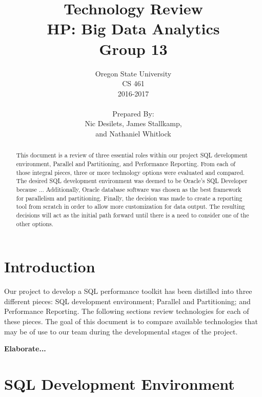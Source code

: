 \documentclass[draftclsnofoot, onecolumn, compsoc, 10pt]{IEEEtran}
\title{\Huge Technology Review\\\large HP: Big Data Analytics\\Group 13}
\author{Oregon State University\\CS 461\\2016-2017\\\\Prepared By:\\Nic Desilets, James Stallkamp,\\and Nathaniel Whitlock}
\begin{document}
\begin{titlingpage}
    \maketitle 
    
    \vspace{1in}
    \begin{abstract}
		\noindent This document is a review of three essential roles within our project SQL development environment, Parallel and Partitioning, and Performance Reporting.
        From each of those integral pieces, three or more technology options were evaluated and compared.
        The desired SQL development environment was deemed to be Oracle's SQL Developer because ...
        Additionally, Oracle database software was chosen as the best framework for parallelism and partitioning.
        Finally, the decision was made to create a reporting tool from scratch in order to allow more customization for data output.
        The resulting decisions will act as the initial path forward until there is a need to consider one of the other options.
    \end{abstract}
\end{titlingpage}

\tableofcontents
\pagebreak

\section{Introduction}
Our project to develop a SQL performance toolkit has been distilled into three different pieces: SQL development environment; Parallel and Partitioning; and Performance Reporting. The following sections review technologies for each of these pieces. The goal of this document is to compare available technologies that may be of use to our team during the developmental stages of the project.


\textbf{Elaborate...}


\section{SQL Development Environment}
\end{document}
